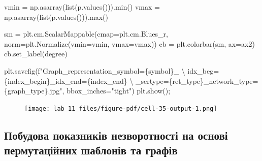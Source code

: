 \documentclass[
  letterpaper,
]{report}
\newenvironment{Shaded}{\begin{snugshade}}{\end{snugshade}}
\newcommand{\BuiltInTok}[1]{\textcolor[rgb]{0.00,0.23,0.31}{#1}}
\newcommand{\CharTok}[1]{\textcolor[rgb]{0.13,0.47,0.30}{#1}}
\newcommand{\NormalTok}[1]{\textcolor[rgb]{0.00,0.23,0.31}{#1}}
\newcommand{\OperatorTok}[1]{\textcolor[rgb]{0.37,0.37,0.37}{#1}}
\newcommand{\SpecialCharTok}[1]{\textcolor[rgb]{0.37,0.37,0.37}{#1}}
\newcommand{\SpecialStringTok}[1]{\textcolor[rgb]{0.13,0.47,0.30}{#1}}
\newcommand{\StringTok}[1]{\textcolor[rgb]{0.13,0.47,0.30}{#1}}
\begin{document}
\begin{Shaded}
\begin{Highlighting}[]
\NormalTok{vmin }\OperatorTok{=}\NormalTok{ np.asarray(}\BuiltInTok{list}\NormalTok{(p.values())).}\BuiltInTok{min}\NormalTok{()}
\NormalTok{vmax }\OperatorTok{=}\NormalTok{ np.asarray(}\BuiltInTok{list}\NormalTok{(p.values())).}\BuiltInTok{max}\NormalTok{()}

\NormalTok{sm }\OperatorTok{=}\NormalTok{ plt.cm.ScalarMappable(cmap}\OperatorTok{=}\NormalTok{plt.cm.Blues\_r, norm}\OperatorTok{=}\NormalTok{plt.Normalize(vmin}\OperatorTok{=}\NormalTok{vmin, vmax}\OperatorTok{=}\NormalTok{vmax))}
\NormalTok{cb }\OperatorTok{=}\NormalTok{ plt.colorbar(sm, ax}\OperatorTok{=}\NormalTok{ax2)}
\NormalTok{cb.set\_label(}\StringTok{\textquotesingle{}degree\textquotesingle{}}\NormalTok{)}

\NormalTok{plt.savefig(}\SpecialStringTok{f"Graph\_representation\_symbol=}\SpecialCharTok{\{}\NormalTok{symbol}\SpecialCharTok{\}}\SpecialStringTok{\_ }\CharTok{\textbackslash{}}
\SpecialStringTok{            idx\_beg=}\SpecialCharTok{\{}\NormalTok{index\_begin}\SpecialCharTok{\}}\SpecialStringTok{\_idx\_end=}\SpecialCharTok{\{}\NormalTok{index\_end}\SpecialCharTok{\}}\SpecialStringTok{ }\CharTok{\textbackslash{}}
\SpecialStringTok{            \_sertype=}\SpecialCharTok{\{}\NormalTok{ret\_type}\SpecialCharTok{\}}\SpecialStringTok{\_network\_type=}\SpecialCharTok{\{}\NormalTok{graph\_type}\SpecialCharTok{\}}\SpecialStringTok{.jpg"}\NormalTok{, bbox\_inches}\OperatorTok{=}\StringTok{"tight"}\NormalTok{)}
\NormalTok{plt.show()}\OperatorTok{;} 
\end{Highlighting}
\end{Shaded}

\begin{figure}[H]

{\centering \texttt{[image: lab\_11\_files/figure-pdf/cell-35-output-1.png]}

}

\end{figure}

\hypertarget{ux43fux43eux431ux443ux434ux43eux432ux430-ux43fux43eux43aux430ux437ux43dux438ux43aux456ux432-ux43dux435ux437ux432ux43eux440ux43eux442ux43dux43eux441ux442ux456-ux43dux430-ux43eux441ux43dux43eux432ux456-ux43fux435ux440ux43cux443ux442ux430ux446ux456ux439ux43dux438ux445-ux448ux430ux431ux43bux43eux43dux456ux432-ux442ux430-ux433ux440ux430ux444ux456ux432}{%
\subsection{Побудова показників незворотності на основі пермутаційних
шаблонів та
графів}\label{ux43fux43eux431ux443ux434ux43eux432ux430-ux43fux43eux43aux430ux437ux43dux438ux43aux456ux432-ux43dux435ux437ux432ux43eux440ux43eux442ux43dux43eux441ux442ux456-ux43dux430-ux43eux441ux43dux43eux432ux456-ux43fux435ux440ux43cux443ux442ux430ux446ux456ux439ux43dux438ux445-ux448ux430ux431ux43bux43eux43dux456ux432-ux442ux430-ux433ux440ux430ux444ux456ux432}}
\end{document}
